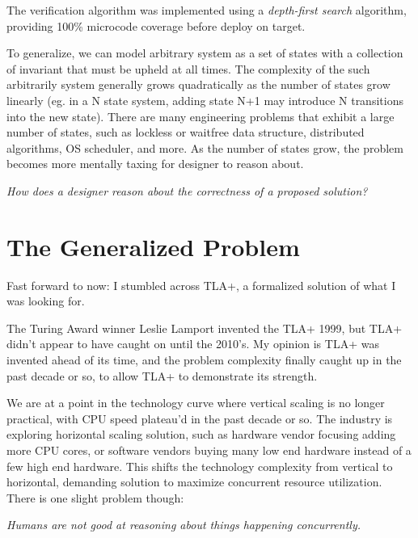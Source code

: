 The verification algorithm was implemented using a \textit{depth-first search}
algorithm, providing 100\% microcode coverage before deploy on target.\newline

To generalize, we can model arbitrary system as a set of states with a
collection of invariant that must be upheld at all times. The complexity of the
such arbitrarily system generally grows quadratically as the number of states
grow linearly (eg. in a N state system, adding state N+1 may introduce N
transitions into the new state). There are many engineering problems that
exhibit a large number of states, such as lockless or waitfree data structure,
distributed algorithms, OS scheduler, and more. As the number of states grow, 
the problem becomes more mentally taxing for designer to reason about.\newline

\textit{How does a designer reason about the correctness of a proposed
solution?}

\section{The Generalized Problem}

Fast forward to now: I stumbled across TLA+, a formalized solution of what I was
looking for.\newline

The Turing Award winner Leslie Lamport invented the TLA+ 1999, but TLA+ didn't
appear to have caught on until the 2010's. My opinion is TLA+ was invented ahead
of its time, and the problem complexity finally caught up in the past decade or
so, to allow TLA+ to demonstrate its strength.\newline

We are at a point in the technology curve where vertical scaling is no longer
practical, with CPU speed plateau'd in the past decade or so. The industry is
exploring horizontal scaling solution, such as hardware vendor focusing adding
more CPU cores, or software vendors buying many low end hardware instead of a
few high end hardware. This shifts the technology complexity from vertical to
horizontal, demanding solution to maximize concurrent resource utilization.
There is one slight problem though:\newline

\textit{Humans are not good at reasoning about things happening
concurrently.}\newline

